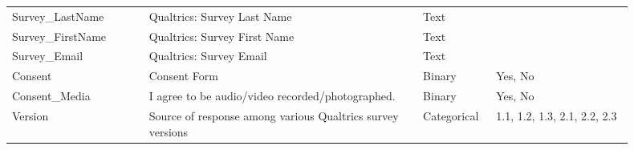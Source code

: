 \documentclass[12pt, letterpaper]{article}
\begin{document}
{\begin{longtable}{|p{0.2\linewidth}|p{0.4\linewidth}|p{0.1\linewidth}|p{0.2\linewidth}|}
Survey\_LastName             & Qualtrics: Survey Last Name                                                                                                                                                                                                                                                         & Text        &                                                                                                                                                                                                                                         \\
Survey\_FirstName            & Qualtrics: Survey First Name                                                                                                                                                                                                                                                        & Text        &                                                                                                                                                                                                                                         \\
Survey\_Email                & Qualtrics: Survey Email                                                                                                                                                                                                                                                             & Text        &                                                                                                                                                                                                                                         \\
Consent                      & Consent Form                                                                                                                                                                                                                                                                        & Binary      & Yes, No
 \\
Consent\_Media               & I agree to be audio/video recorded/photographed.                                                                                                                                                                                                                                    & Binary      & Yes, No
\\
Version                      & Source of response among various Qualtrics survey versions                                                                                                                                                                                                                       & Categorical & 1.1, 1.2, 1.3, 2.1, 2.2, 2.3 \\

\end{longtable}}
\end{document}

